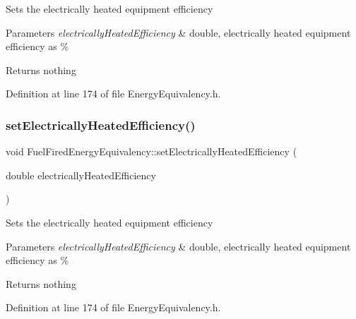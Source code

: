 Sets the electrically heated equipment efficiency


\begin{DoxyParams}{Parameters}
{\em electrically\+Heated\+Efficiency} & double, electrically heated equipment efficiency as \%\\
\hline
\end{DoxyParams}
\begin{DoxyReturn}{Returns}
nothing 
\end{DoxyReturn}


Definition at line 174 of file Energy\+Equivalency.\+h.

\mbox{\label{class_fuel_fired_energy_equivalency_a2e8e166d9824ee07805cd790eff5e361}} 
\subsubsection{\texorpdfstring{set\+Electrically\+Heated\+Efficiency()}{setElectricallyHeatedEfficiency()}\hspace{0.1cm}{\footnotesize\ttfamily [2/3]}}
{\footnotesize\ttfamily void Fuel\+Fired\+Energy\+Equivalency\+::set\+Electrically\+Heated\+Efficiency (\begin{DoxyParamCaption}\item[{double}]{electrically\+Heated\+Efficiency }\end{DoxyParamCaption})\hspace{0.3cm}{\ttfamily [inline]}}

Sets the electrically heated equipment efficiency


\begin{DoxyParams}{Parameters}
{\em electrically\+Heated\+Efficiency} & double, electrically heated equipment efficiency as \%\\
\hline
\end{DoxyParams}
\begin{DoxyReturn}{Returns}
nothing 
\end{DoxyReturn}


Definition at line 174 of file Energy\+Equivalency.\+h.

\mbox{\label{class_fuel_fired_energy_equivalency_a2e8e166d9824ee07805cd790eff5e361}} 
